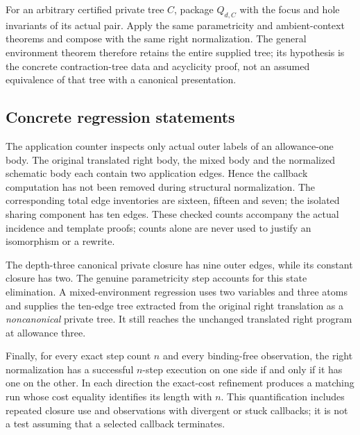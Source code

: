 For an arbitrary certified private tree $C$, package $Q_{d,C}$ with the
focus and hole invariants of its actual pair. Apply the same parametricity
and ambient-context theorems and compose with the same right normalization.
The general environment theorem therefore retains the entire supplied tree;
its hypothesis is the concrete contraction-tree data and acyclicity proof,
not an assumed equivalence of that tree with a canonical presentation.

\subsection{Concrete regression statements}
The application counter inspects only actual outer labels of an
allowance-one body. The original translated right body, the mixed body and
the normalized schematic body each contain two application edges. Hence
the callback computation has not been removed during structural normalization.
The corresponding total edge inventories are sixteen, fifteen and seven;
the isolated sharing component has ten edges. These checked counts accompany
the actual incidence and template proofs; counts alone are never used to
justify an isomorphism or a rewrite.

The depth-three canonical private closure has nine outer edges, while its
constant closure has two. The genuine parametricity step accounts for this
state elimination. A mixed-environment regression uses two variables and
three atoms and supplies the ten-edge tree extracted from the original
right translation as a \emph{noncanonical} private tree. It still reaches
the unchanged translated right program at allowance three.

Finally, for every exact step count $n$ and every binding-free observation,
the right normalization has a successful $n$-step execution on one side
if and only if it has one on the other. In each direction the exact-cost
refinement produces a matching run whose cost equality identifies its
length with $n$. This quantification includes repeated closure use and
observations with divergent or stuck callbacks; it is not a test assuming
that a selected callback terminates.

